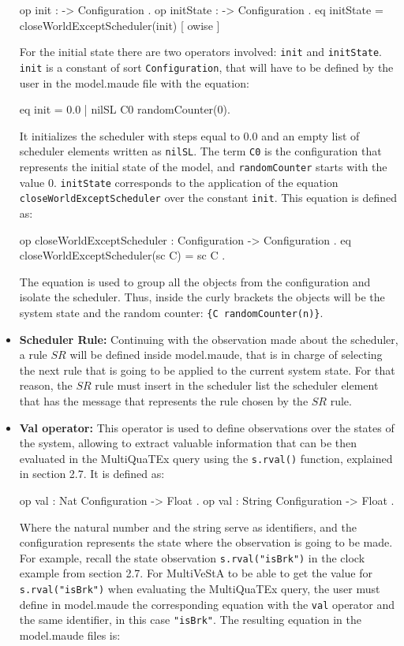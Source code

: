 \begin{itemize}
\begin{maude}
op init : -> Configuration .
op initState : -> Configuration .
eq initState = closeWorldExceptScheduler(init) [ owise ] \end{maude}
    For the initial state there are two operators involved: \texttt{init} and \texttt{initState}. \texttt{init} is a constant of sort \texttt{Configuration}, that will have to be defined by the user in the model.maude file with the equation:
    \begin{maude}

eq init = {0.0 | nilSL} C0 randomCounter(0). \end{maude}
    It initializes the scheduler with steps equal to 0.0 and an empty list of scheduler elements written as \texttt{nilSL}. The term \texttt{C0} is the configuration that represents the initial state of the model, and \texttt{randomCounter} starts with the value 0. \texttt{initState} corresponds to the application of the equation \texttt{closeWorldExceptScheduler} over the constant \texttt{init}. This equation is defined as:
    \begin{maude}
    
op closeWorldExceptScheduler : Configuration -> Configuration .
eq closeWorldExceptScheduler(sc C) = sc { C } .\end{maude}
    The equation is used to group all the objects from the configuration and isolate the scheduler. Thus, inside the curly brackets the objects will be the system state and the random counter: \texttt{\{C randomCounter(n)\}}.   
    
\item \textbf{Scheduler Rule:} Continuing with the observation made about the scheduler, a rule $SR$ will be defined inside model.maude, that is in charge of selecting the next rule that is going to be applied to the current system state. For that reason, the $SR$ rule must insert in the scheduler list the scheduler element that has the message that represents the rule chosen by the $SR$ rule.

\item \textbf{Val operator:} This operator is used to define observations over the states of the system, allowing to extract valuable information that can be then evaluated in the MultiQuaTEx query using the \texttt{s.rval()} function, explained in section 2.7. It is defined as:
\begin{maude}

op val : Nat Configuration -> Float .
op val : String Configuration -> Float . \end{maude}
Where the natural number and the string serve as identifiers, and the configuration represents the state where the observation is going to be made. For example, recall the state observation \texttt{s.rval("isBrk")} in the clock example from section 2.7. For MultiVeStA to be able to get the value for \texttt{s.rval("isBrk")} when evaluating the MultiQuaTEx query, the user must define in model.maude the corresponding equation with the \texttt{val} operator and the same identifier, in this case \texttt{"isBrk"}. The resulting equation in the model.maude files is:
\begin{maude}


\end{maude}
\end{itemize}
